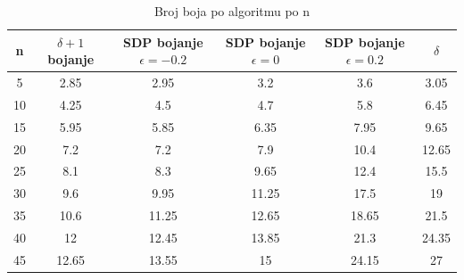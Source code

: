 \documentclass[diplomskirad]{fer}
\begin{document}
\begin{table}
  \caption{Broj boja po algoritmu po n}
  \label{table:bojanje_n}
  \begin{tabular}{|c|c|c|c|c|c|}
    \hline
    n & $\delta +1$ bojanje & SDP bojanje $\epsilon = -0.2$& SDP bojanje $\epsilon = 0$ & SDP bojanje $\epsilon = 0.2$ & $\delta$ \\
    \hline
    \hline
    5 & 2.85 & 2.95 & 3.2 & 3.6 & 3.05\\
    \hline
    10 & 4.25 & 4.5 & 4.7 & 5.8 & 6.45\\
    \hline
    15 & 5.95 & 5.85 & 6.35 & 7.95 & 9.65\\
    \hline
    20 & 7.2 & 7.2 & 7.9 & 10.4 & 12.65\\
    \hline
    25 & 8.1 & 8.3 & 9.65 & 12.4 & 15.5\\
    \hline
    30 & 9.6 & 9.95 & 11.25 & 17.5 & 19\\
    \hline
    35 & 10.6 & 11.25 & 12.65 & 18.65 & 21.5\\
    \hline
    40 & 12 & 12.45 & 13.85 & 21.3 & 24.35\\
    \hline
    45 & 12.65 & 13.55 & 15 & 24.15 & 27    \\
    \hline
  \end{tabular}
\end{table}
\end{document}
